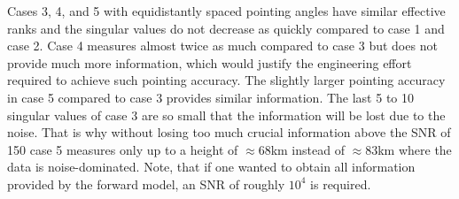 Cases 3, 4, and 5 with equidistantly spaced pointing angles have similar effective ranks and the singular values do not decrease as quickly compared to case 1 and case 2.
Case 4 measures almost twice as much compared to case 3 but does not provide much more information, which would justify the engineering effort required to achieve such pointing accuracy.
The slightly larger pointing accuracy in case 5 compared to case 3 provides similar information.
The last 5 to 10 singular values of case 3 are so small that the information will be lost due to the noise.
That is why without losing too much crucial information above the SNR of 150 case 5 measures only up to a height of $\approx 68$km instead of $\approx83$km where the data is noise-dominated.
Note, that if one wanted to obtain all information provided by the forward model, an SNR of roughly $10^4$ is required.
% 
